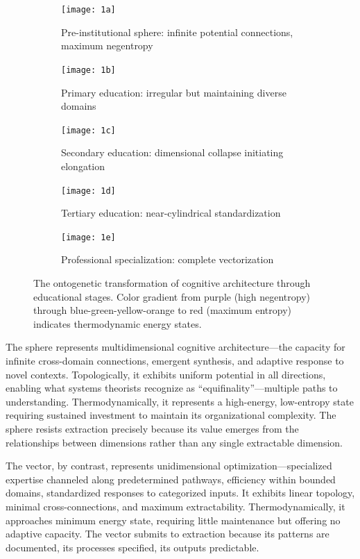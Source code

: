 \begin{figure}[htbp]
\centering
\begin{subfigure}[b]{0.18\textwidth}
    \centering
    \texttt{[image: 1a]}
    \caption{\small Pre-institutional sphere: infinite potential connections, maximum negentropy}
\end{subfigure}
\hfill
\begin{subfigure}[b]{0.18\textwidth}
    \centering
    \texttt{[image: 1b]}
    \caption{\small Primary education: irregular but maintaining diverse domains}
\end{subfigure}
\hfill
\begin{subfigure}[b]{0.18\textwidth}
    \centering
    \texttt{[image: 1c]}
    \caption{\small Secondary education: dimensional collapse initiating elongation}
\end{subfigure}
\hfill
\begin{subfigure}[b]{0.18\textwidth}
    \centering
    \texttt{[image: 1d]}
    \caption{\small Tertiary education: near-cylindrical standardization}
\end{subfigure}
\hfill
\begin{subfigure}[b]{0.18\textwidth}
    \centering
    \texttt{[image: 1e]}
    \caption{\small Professional specialization: complete vectorization}
\end{subfigure}
\caption{The ontogenetic transformation of cognitive architecture through educational stages. Color gradient from purple (high negentropy) through blue-green-yellow-orange to red (maximum entropy) indicates thermodynamic energy states.}
\label{fig:from-sphere-to-vector}
\end{figure}

The sphere represents multidimensional cognitive architecture---the capacity for infinite cross-domain connections, emergent synthesis, and adaptive response to novel contexts. Topologically, it exhibits uniform potential in all directions, enabling what systems theorists recognize as ``equifinality''---multiple paths to understanding. Thermodynamically, it represents a high-energy, low-entropy state requiring sustained investment to maintain its organizational complexity. The sphere resists extraction precisely because its value emerges from the relationships between dimensions rather than any single extractable dimension.

The vector, by contrast, represents unidimensional optimization---specialized expertise channeled along predetermined pathways, efficiency within bounded domains, standardized responses to categorized inputs. It exhibits linear topology, minimal cross-connections, and maximum extractability. Thermodynamically, it approaches minimum energy state, requiring little maintenance but offering no adaptive capacity. The vector submits to extraction because its patterns are documented, its processes specified, its outputs predictable.


